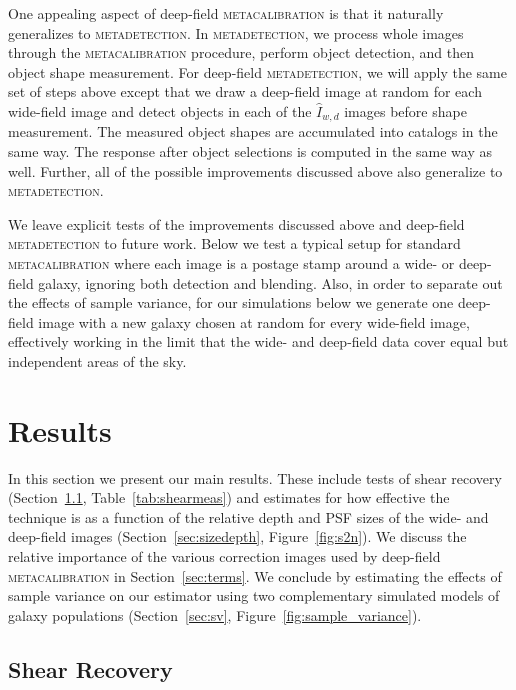 \documentclass[twocolumn]{openjournal}
\makeatletter
\newcommand{\mdet}{\textsc{metadetection}\@\xspace}
\newcommand{\mcal}{\textsc{metacalibration}\@\xspace}
\makeatother
\begin{document}
One appealing aspect of deep-field \mcal is that it naturally generalizes to
\mdet. In \mdet, we process whole images through the \mcal procedure, perform object
detection, and then object shape measurement. For deep-field \mdet, we will apply the
same set of steps above except that we draw a deep-field image at random for each
wide-field image and detect objects in each of the $\hat I_{w,d}$ images before shape
measurement. The measured object shapes are accumulated into catalogs in the same way.
The response after object selections is computed in the same way as well. Further, all
of the possible improvements discussed above also generalize to \mdet.

We leave explicit tests of the improvements discussed above and deep-field \mdet to
future work. Below we test a typical setup for standard \mcal where each image is a
postage stamp around a wide- or deep-field galaxy, ignoring both detection and blending.
Also, in order to separate out the effects of sample variance, for our simulations below
we generate one deep-field image with a new galaxy chosen at random for every wide-field
image, effectively working in the limit that the wide- and deep-field data cover
equal but independent areas of the sky.


\section{Results}\label{sec:results}

In this section we present our main results. These include tests of shear recovery
(Section~\ref{sec:mc}, Table~\ref{tab:shearmeas}) and estimates for how effective the
technique is as a function of the relative depth and PSF sizes of the wide- and
deep-field images (Section~\ref{sec:sizedepth}, Figure~\ref{fig:s2n}). We discuss the
relative importance of the various correction images used by deep-field \mcal in
Section~\ref{sec:terms}. We conclude by estimating the effects of sample variance on our
estimator using two complementary simulated models of galaxy populations
(Section~\ref{sec:sv}, Figure~\ref{fig:sample_variance}).


\subsection{Shear Recovery}\label{sec:mc}
\end{document}
